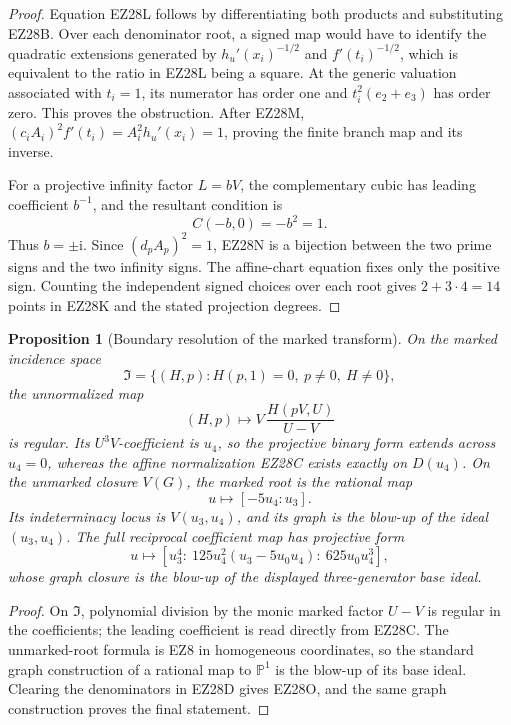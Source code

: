 \documentclass[11pt]{article}
\newtheorem{proposition}[theorem]{Proposition}
\theoremstyle{definition}\newtheorem{definition}[theorem]{Definition}
\theoremstyle{remark}\newtheorem{remark}[theorem]{Remark}
\newcommand{\ii}{\mathrm i}
\begin{document}
\begin{proof}
Equation EZ28L follows by differentiating both products and substituting
EZ28B.  Over each denominator root, a signed map would have to identify the
quadratic extensions generated by \(h_u'(x_i)^{-1/2}\) and
\(f'(t_i)^{-1/2}\), which is equivalent to the ratio in EZ28L being a square.
At the generic valuation associated with \(t_i=1\), its numerator has order
one and \(t_i^2(e_2+e_3)\) has order zero.  This proves the obstruction.
After EZ28M,
\((c_iA_i)^2f'(t_i)=A_i^2h_u'(x_i)=1\), proving the finite branch map and
its inverse.

For a projective infinity factor \(L=bV\), the complementary cubic has leading
coefficient \(b^{-1}\), and the resultant condition is
\[
 C(-b,0)=-b^2=1.
\]
Thus \(b=\pm\ii\).  Since \((d_pA_p)^2=1\), EZ28N is a bijection between the
two prime signs and the two infinity signs.  The affine-chart equation fixes
only the positive sign.  Counting the independent signed choices over each
root gives \(2+3\cdot4=14\) points in EZ28K and the stated projection degrees.
\end{proof}

\begin{proposition}[Boundary resolution of the marked transform]
On the marked incidence space
\[
 \mathfrak I=\{(H,p):H(p,1)=0,\ p\ne0,\ H\ne0\},
\]
the unnormalized map
\[
 (H,p)\longmapsto V\,\frac{H(pV,U)}{U-V}
\]
is regular.  Its \(U^3V\)-coefficient is \(u_4\), so the projective binary form
extends across \(u_4=0\), whereas the affine normalization EZ28C exists exactly
on \(D(u_4)\).  On the unmarked closure \(V(G)\), the marked root is the
rational map
\[
 u\longmapsto[-5u_4:u_3].
\]
Its indeterminacy locus is \(V(u_3,u_4)\), and its graph is the blow-up of the
ideal \((u_3,u_4)\).  The full reciprocal coefficient map has projective form
\begin{equation}
 u\longmapsto
 [u_3^4:\ 125u_4^2(u_3-5u_0u_4):\ 625u_0u_4^3],       \tag{EZ28O}
\end{equation}
whose graph closure is the blow-up of the displayed three-generator base
ideal.
\end{proposition}

\begin{proof}
On \(\mathfrak I\), polynomial division by the monic marked factor \(U-V\)
is regular in the coefficients; the leading coefficient is read directly
from EZ28C.  The unmarked-root formula is EZ8 in homogeneous coordinates, so
the standard graph construction of a rational map to \(\mathbb P^1\) is the
blow-up of its base ideal.  Clearing the denominators in EZ28D gives EZ28O,
and the same graph construction proves the final statement.
\end{proof}
\end{document}
